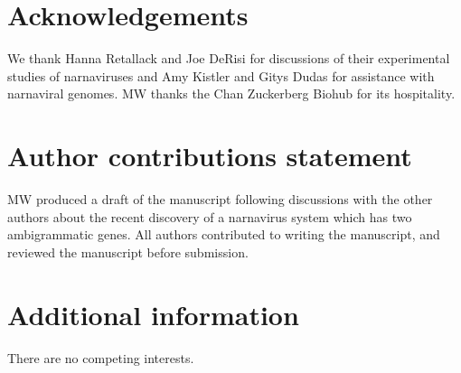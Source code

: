 \documentclass[9pt,lineno]{elife}
\begin{document}



\section*{Acknowledgements}

We thank Hanna Retallack and Joe DeRisi for discussions of their experimental studies of narnaviruses
and Amy Kistler and Gitys Dudas for assistance with narnaviral genomes.
MW thanks the Chan Zuckerberg Biohub for its hospitality. 

\section*{Author contributions statement}

MW produced a draft of the manuscript following discussions with the other 
authors about the recent discovery of a narnavirus system which has two 
ambigrammatic genes. All authors contributed to writing the manuscript, and 
reviewed the manuscript before submission. 

\section*{Additional information}

There are no competing interests.
\end{document}

